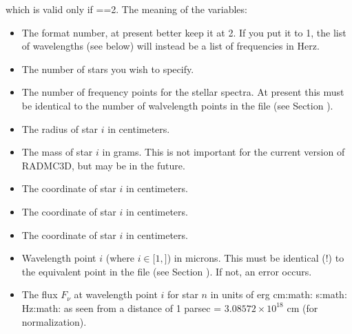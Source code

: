 \documentclass[letterpaper,10pt,english]{sphinxmanual}
\begin{document}
which is valid only if ==2. The meaning of the variables:
\begin{itemize}
\item {} 
 The format number, at present better keep it at 2.
If you put it to 1, the list of wavelengths (see below) will instead be
a list of frequencies in Herz.

\item {} 
 The number of stars you wish to specify.

\item {} 
 The number of frequency points for the stellar
spectra. At present this must be identical to the number of walvelength
points in the file  (see Section {\hyperref[\detokenize{inputoutputfiles:sec-wavelengths}]{}}).

\item {} 
 The radius of star \(i\) in centimeters.

\item {} 
 The mass of star \(i\) in grams. This is not
important for the current version of RADMC\sphinxhyphen{}3D, but may be in the
future.

\item {} 
 The \sphinxhyphen{}coordinate of star \(i\) in centimeters.

\item {} 
 The \sphinxhyphen{}coordinate of star \(i\) in centimeters.

\item {} 
 The \sphinxhyphen{}coordinate of star \(i\) in centimeters.

\item {} 
 Wavelength point \(i\) (where \(i\in [1,\)\(]\)) in microns. This must be identical (!) to the equivalent
point in the file  (see Section {\hyperref[\detokenize{inputoutputfiles:sec-wavelengths}]{}}). If not, an error occurs.

\item {} 
 The flux \(F_\nu\) at wavelength point \(i\)
for star \(n\) in units of erg cm:math: s:math: Hz:math: as seen from a
distance of 1 parsec = \(3.08572\times 10^{18}\) cm (for normalization).

\end{itemize}
\end{document}
